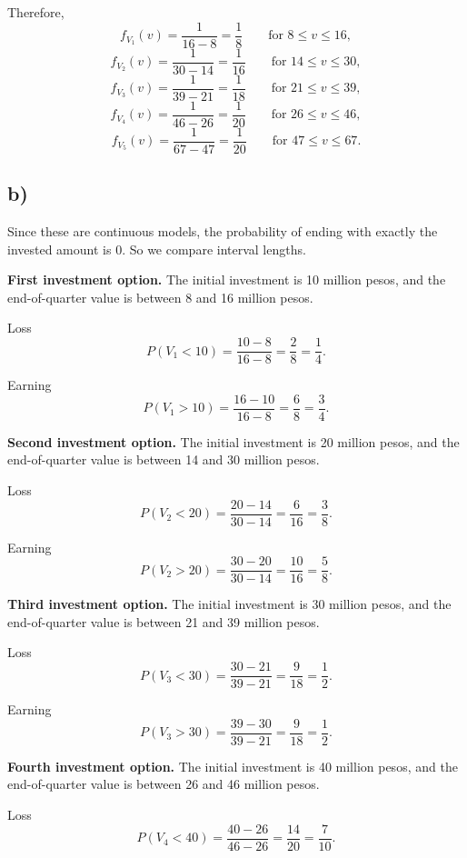 Therefore,
\[
f_{V_1}(v)=\frac{1}{16-8}=\frac18
\qquad \text{for }8\le v\le 16,
\]
\[
f_{V_2}(v)=\frac{1}{30-14}=\frac{1}{16}
\qquad \text{for }14\le v\le 30,
\]
\[
f_{V_3}(v)=\frac{1}{39-21}=\frac{1}{18}
\qquad \text{for }21\le v\le 39,
\]
\[
f_{V_4}(v)=\frac{1}{46-26}=\frac{1}{20}
\qquad \text{for }26\le v\le 46,
\]
\[
f_{V_5}(v)=\frac{1}{67-47}=\frac{1}{20}
\qquad \text{for }47\le v\le 67.
\]

\subsection*{b)}
Since these are continuous models, the probability of ending with exactly the invested amount is $0$. So we compare interval lengths.

\medskip

\textbf{First investment option.}
The initial investment is 10 million pesos, and the end-of-quarter value is between 8 and 16 million pesos.

Loss
\[
P(V_1<10)=\frac{10-8}{16-8}=\frac{2}{8}=\frac14.
\]

Earning
\[
P(V_1>10)=\frac{16-10}{16-8}=\frac{6}{8}=\frac34.
\]

\medskip

\textbf{Second investment option.}
The initial investment is 20 million pesos, and the end-of-quarter value is between 14 and 30 million pesos.

Loss
\[
P(V_2<20)=\frac{20-14}{30-14}=\frac{6}{16}=\frac38.
\]

Earning
\[
P(V_2>20)=\frac{30-20}{30-14}=\frac{10}{16}=\frac58.
\]

\medskip

\textbf{Third investment option.}
The initial investment is 30 million pesos, and the end-of-quarter value is between 21 and 39 million pesos.

Loss
\[
P(V_3<30)=\frac{30-21}{39-21}=\frac{9}{18}=\frac12.
\]

Earning
\[
P(V_3>30)=\frac{39-30}{39-21}=\frac{9}{18}=\frac12.
\]

\medskip

\textbf{Fourth investment option.}
The initial investment is 40 million pesos, and the end-of-quarter value is between 26 and 46 million pesos.

Loss
\[
P(V_4<40)=\frac{40-26}{46-26}=\frac{14}{20}=\frac{7}{10}.
\]

